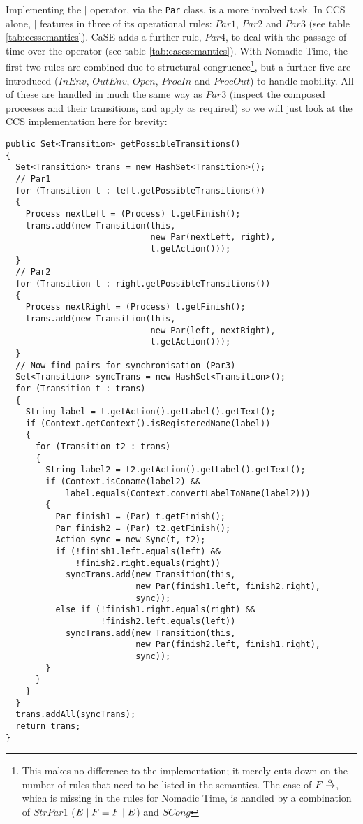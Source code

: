 Implementing the $\mid$ operator, via the \texttt{Par} class, is a
more involved task.  In CCS alone, $\mid$ features in three of its
operational rules: $Par1$, $Par2$ and $Par3$ (see table
\ref{tab:ccssemantics}).  CaSE adds a further rule, $Par4$, to deal
with the passage of time over the operator (see table
\ref{tab:casesemantics}).  With Nomadic Time, the first two rules are
combined due to structural congruence\footnote{This makes no
  difference to the implementation; it merely cuts down on the number
  of rules that need to be listed in the semantics.  The case of $F
  \stackrel{\alpha}{\rightarrow}$, which is missing in the rules for Nomadic Time,
  is handled by a combination of $StrPar1$ ($E \;|\; F \equiv F \;|\; E$)
  and $SCong$}, but a further five are introduced ($InEnv$, $OutEnv$,
$Open$, $ProcIn$ and $ProcOut$) to handle mobility.  All of these are
handled in much the same way as $Par3$ (inspect the composed processes
and their transitions, and apply as required) so we will just look at
the CCS implementation here for brevity:

\begin{verbatim}
public Set<Transition> getPossibleTransitions()
{
  Set<Transition> trans = new HashSet<Transition>();
  // Par1
  for (Transition t : left.getPossibleTransitions())
  {
    Process nextLeft = (Process) t.getFinish();
    trans.add(new Transition(this,
                             new Par(nextLeft, right),
                             t.getAction()));
  }
  // Par2
  for (Transition t : right.getPossibleTransitions())
  {
    Process nextRight = (Process) t.getFinish();
    trans.add(new Transition(this,
                             new Par(left, nextRight),
                             t.getAction()));
  }
  // Now find pairs for synchronisation (Par3)
  Set<Transition> syncTrans = new HashSet<Transition>();
  for (Transition t : trans)
  {
    String label = t.getAction().getLabel().getText();
    if (Context.getContext().isRegisteredName(label))
    {
      for (Transition t2 : trans)
      {
        String label2 = t2.getAction().getLabel().getText();
        if (Context.isConame(label2) &&
            label.equals(Context.convertLabelToName(label2)))
        {
          Par finish1 = (Par) t.getFinish();
          Par finish2 = (Par) t2.getFinish();
          Action sync = new Sync(t, t2);
          if (!finish1.left.equals(left) &&
              !finish2.right.equals(right))
            syncTrans.add(new Transition(this,
                          new Par(finish1.left, finish2.right),
                          sync));
          else if (!finish1.right.equals(right) &&
                   !finish2.left.equals(left))
            syncTrans.add(new Transition(this,
                          new Par(finish2.left, finish1.right),
                          sync));
        }
      }
    }
  }
  trans.addAll(syncTrans);
  return trans;
}
\end{verbatim}

